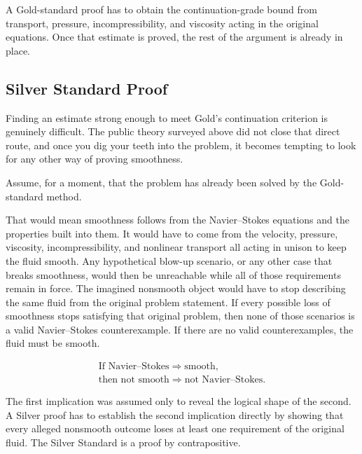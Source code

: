 A Gold-standard proof has to obtain the continuation-grade bound from transport, pressure, incompressibility, and viscosity acting in the original equations.
Once that estimate is proved, the rest of the argument is already in place.

\subsection{Silver Standard Proof}\label{sub:SilverStandardProof}

Finding an estimate strong enough to meet Gold's continuation criterion is genuinely difficult.
The public theory surveyed above did not close that direct route, and once you dig your teeth into the problem, it becomes tempting to look for any other way of proving smoothness.

Assume, for a moment, that the problem has already been solved by the Gold-standard method.

That would mean smoothness follows from the Navier--Stokes equations and the properties built into them.
It would have to come from the velocity, pressure, viscosity, incompressibility, and nonlinear transport all acting in unison to keep the fluid smooth.
Any hypothetical blow-up scenario, or any other case that breaks smoothness, would then be unreachable while all of those requirements remain in force.
The imagined nonsmooth object would have to stop describing the same fluid from the original problem statement.
If every possible loss of smoothness stops satisfying that original problem, then none of those scenarios is a valid Navier--Stokes counterexample.
If there are no valid counterexamples, the fluid must be smooth.

\[
  \begin{gathered}
  \text{If Navier--Stokes}\Longrightarrow\text{smooth},
  \\
  \text{then not smooth}\Longrightarrow\text{not Navier--Stokes}.
  \end{gathered}
\]

The first implication was assumed only to reveal the logical shape of the second.
A Silver proof has to establish the second implication directly by showing that every alleged nonsmooth outcome loses at least one requirement of the original fluid.
The Silver Standard is a proof by contrapositive.

